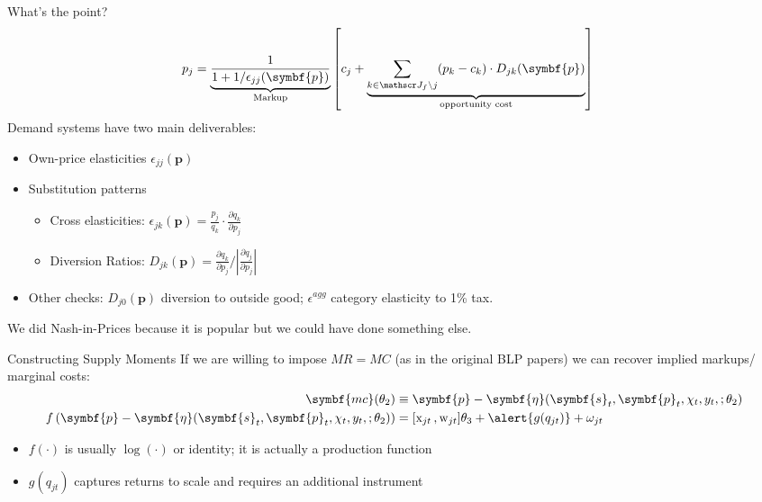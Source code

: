 \documentclass[aspectratio=169,10pt]{beamer}
\begin{document}
\begin{frame}{What's the point?}
\begin{align*}
p_j &= \underbrace{\frac{1}{1+1/\epsilon_{jj}(\symbf{p})}}_{\text{Markup}} \left[c_j + \underbrace{\sum_{k \in \calJ_{f} \setminus j}  (p_k-c_k) \cdot  D_{jk} (\symbf{p}) }_{\text{opportunity cost}}\right]
\end{align*}
Demand systems have two main deliverables:
\begin{itemize}
\item Own-price elasticities $\epsilon_{jj}(\symbf{p})$
\item Substitution patterns
\begin{itemize}
\item Cross elasticities: $\epsilon_{jk}(\symbf{p}) = \frac{p_j}{q_k} \cdot \frac{\partial q_k}{\partial p_j}$
\item Diversion Ratios: $D_{jk}(\symbf{p}) = \frac{\partial q_k}{\partial p_j}/|\frac{\partial q_j}{\partial p_j}|$
\end{itemize}
\item Other checks: $D_{j0}(\symbf{p})$ diversion to outside good; $\epsilon^{agg}$ category elasticity to 1\% tax.
\end{itemize}
We did Nash-in-Prices because it is popular but we could have done something else.
\end{frame}









\begin{frame}{Constructing Supply Moments}
If we are willing to impose $MR = MC$ (as in the original BLP papers) we can recover implied markups/ marginal costs:
\begin{align*}
\symbf{mc}(\theta_2)&\equiv \symbf{p}- \symbf{\eta}(\symbf{s}_t,\symbf{p}_t,\chi_t, y_t, ;\theta_2) \\
f\left(\symbf{p}- \symbf{\eta}(\symbf{s}_t,\symbf{p}_t,\chi_t, y_t, ;\theta_2)  \right) &= [\textrm{x}_{jt} \,, \textrm{w}_{jt}] \theta_3 + \alert{g(q_{jt})} +  \omega_{jt}
\end{align*}
\begin{itemize}
\item $f(\cdot)$ is usually $\log(\cdot)$ or identity; it is actually a \alert{production function}
\item $g(q_{jt})$ captures \alert{returns to scale} and requires an additional \alert{instrument}
\end{itemize}
\end{frame}
\end{document}
